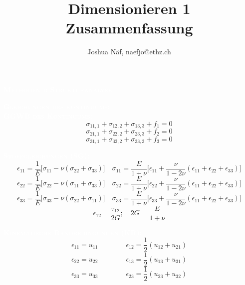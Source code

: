 \documentclass[a4paper,10pt]{article}
\title{Dimensionieren 1 Zusammenfassung}
\author{Joshua Näf, naefjo@ethz.ch}
\date{}
\begin{document}
\newcommand{\mysec}[1]{\colorbox{seccol}{\textcolor{white}{\parbox{\linewidth-2.4mm}{\scshape{\large\textbf{#1}} }}}}
\newcommand{\mysubsec}[1]{\colorbox{subseccol}{\textcolor{white}{\scshape{\normalsize\textbf{#1}}}}\\}
\newcommand{\mysubsubsec}[1]{\colorbox{subsubseccol}{\textcolor{white}{\scshape{\footnotesize\textbf{#1}}}}\\}

\begin{multicols*}{3}

\mysec{Methoden d Strukturanalyse}
    \mysubsec{Gleichungen des kontinuums:}
        \mysubsubsec{GGWB des Kontinuums:}
            \[\sigma_{11,1} + \sigma_{12,2} + \sigma_{13,3} + f_1 = 0\]
            \[\sigma_{21,1} + \sigma_{22,2} + \sigma_{23,3} + f_2 = 0\]
            \[\sigma_{31,1} + \sigma_{32,2} + \sigma_{33,3} + f_3 = 0\]
            
        \mysubsubsec{Stoffgleichungen (SG):}
            \small\[\epsilon_{11} = \frac{1}{E}\lbrack\sigma_{11} - \nu(\sigma_{22} + \sigma_{33})\rbrack \quad \sigma_{11}=\frac{E}{1+\nu}\lbrack\epsilon_{11}+\frac{\nu}{1-2\nu}(\epsilon_{11}+\epsilon_{22}+\epsilon_{33})\rbrack\]
            \[\epsilon_{22} = \frac{1}{E}\lbrack\sigma_{22} - \nu(\sigma_{11} + \sigma_{33})\rbrack \quad \sigma_{22}=\frac{E}{1+\nu}\lbrack\epsilon_{22}+\frac{\nu}{1-2\nu}(\epsilon_{11}+\epsilon_{22}+\epsilon_{33})\rbrack\]
            \[\epsilon_{33} = \frac{1}{E}\lbrack\sigma_{33} - \nu(\sigma_{22} + \sigma_{11})\rbrack \quad \sigma_{33}=\frac{E}{1+\nu}\lbrack\epsilon_{33}+\frac{\nu}{1-2\nu}(\epsilon_{11}+\epsilon_{22}+\epsilon_{33})\rbrack\]\normalsize
            \[\epsilon_{12}=\frac{\tau_{12}}{2G}; \quad 2G=\frac{E}{1+\nu}\]
            
        \mysubsubsec{Kinematische Randbedingungen (KR):}
            \[\epsilon_{11} = u_{11}\quad\quad\quad\quad\epsilon_{12} = \frac{1}{2}(u_{12} + u_{21})\]
            \[\epsilon_{22} = u_{22}\quad\quad\quad\quad\epsilon_{13} = \frac{1}{2}(u_{13} + u_{31})\]
            \[\epsilon_{33} = u_{33}\quad\quad\quad\quad\epsilon_{23} = \frac{1}{2}(u_{23} + u_{32})\]
        

\end{multicols*}
\end{document}
